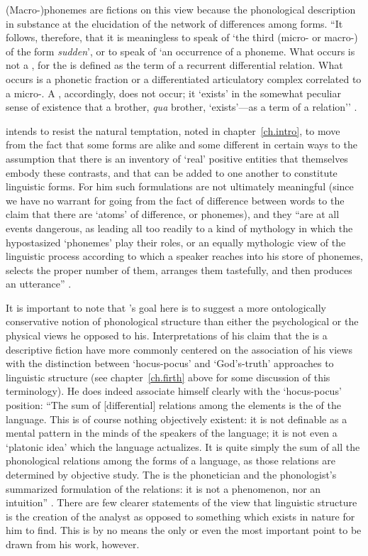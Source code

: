 (Macro-)phonemes are fictions on this view because the phonological
description in substance  at the elucidation of the network of
differences among forms. ``It follows, therefore, that it is
meaningless to speak of `the third  (micro- or macro-) of the
form \emph{sudden}', or to speak of `an occurrence of a pho\-neme. What
occurs is not a , for the  is defined as the term of a
recurrent differential relation. What occurs is a phonetic fraction or
a differentiated articulatory complex correlated to a micro-. A
, accordingly, does not occur; it `exists' in the somewhat
peculiar sense of existence that a brother, \emph{qua} brother,
`exists'—as a term of a relation'' \citep[49]{twaddell35:on.defining}.

{\Twaddell} intends to resist the natural temptation, noted in
chapter~\ref{ch.intro}, to move from the fact that some forms are alike
and some different in certain ways to the assumption that there is an
inventory of `real' positive entities that themselves embody these
contrasts, and that can be added to one another to constitute
linguistic forms. For him such formulations are not ultimately
meaningful (since we have no warrant for going from the fact of
difference between words to the claim that there are `atoms' of
difference, or phonemes), and they ``are at all events dangerous, as
leading all too readily to a kind of mythology in which the
hypostasized `phonemes' play their roles, or an equally mythologic
view of the linguistic process according to which a speaker reaches
into his store of phonemes, selects the proper number of them,
arranges them tastefully, and then produces an utterance''
\citep[53]{twaddell35:on.defining}.

It is important to note that {\Twaddell}'s goal here is to suggest a more
on\-tologically conservative notion of phonological structure than
either the psychological or the physical views he opposed to
his. Interpretations of his claim that the  is a descriptive
fiction have more commonly centered on the association of his views
with the distinction between `hocus-pocus' and `God's-truth'
approaches to linguistic structure (see chapter~\ref{ch.firth} above
for some discussion of this terminology). He does indeed associate
himself clearly with the `hocus-pocus' position: ``The sum of
[differential] relations among the elements is the 
of the language. This  is of course nothing
objectively existent: it is not definable as a mental pattern in the
minds of the speakers of the language; it is not even a `platonic
idea' which the language actualizes. It is quite simply the sum of all
the phonological relations among the forms of a language, as those
relations are determined by objective study. The 
is the phonetician and the phonologist's summarized formulation of the
relations: it is not a phenomenon, nor an intuition''
\citep[53]{twaddell35:on.defining}. There are few clearer statements
of the view that linguistic structure is the creation of the analyst
as opposed to something which exists in nature for him to find. This
is by no means the only or even the most important point to be drawn
from his work, however.

